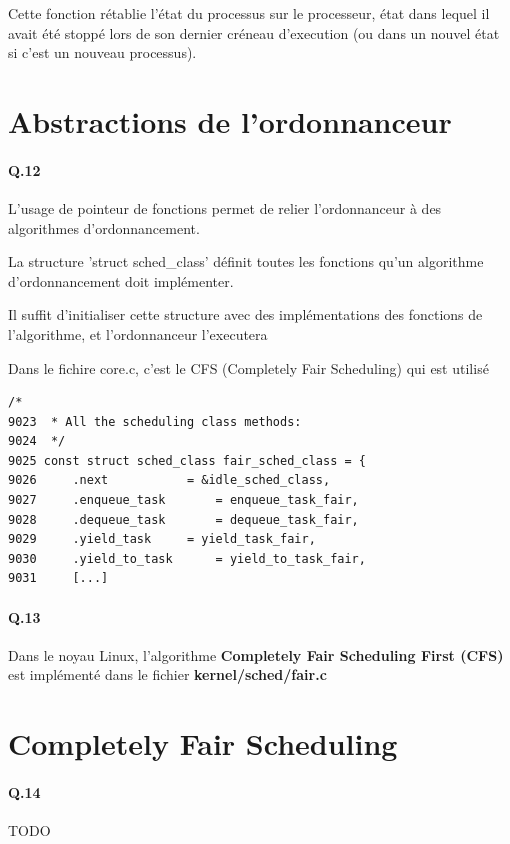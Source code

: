 \documentclass[10pt]{article}
\begin{document}
 Cette fonction rétablie l'état du processus sur le processeur, état dans lequel il avait été stoppé lors de son dernier créneau d'execution (ou dans un nouvel état si c'est un nouveau processus).

\newpage
\section{Abstractions de l'ordonnanceur}
 \paragraph{Q.12}
 L'usage de pointeur de fonctions permet de relier l'ordonnanceur à des algorithmes d'ordonnancement.
 
 La structure 'struct sched_class' définit toutes les fonctions qu'un algorithme d'ordonnancement doit implémenter.
 
 Il suffit d'initialiser cette structure avec des implémentations des fonctions de l'algorithme, et l'ordonnanceur l'executera

 Dans le fichire core.c, c'est le CFS (Completely Fair Scheduling) qui est utilisé

\lstset{language=C}
\begin{lstlisting}[frame=single]
      /*
9023  * All the scheduling class methods:
9024  */ 
9025 const struct sched_class fair_sched_class = {
9026     .next           = &idle_sched_class,
9027     .enqueue_task       = enqueue_task_fair,
9028     .dequeue_task       = dequeue_task_fair,
9029     .yield_task     = yield_task_fair,
9030     .yield_to_task      = yield_to_task_fair,
9031     [...] 
\end{lstlisting}

  \paragraph{Q.13}
  Dans le noyau Linux, l'algorithme \textbf{Completely Fair Scheduling First (CFS)} est implémenté dans le fichier \textbf{kernel/sched/fair.c}


\newpage
\section{Completely Fair Scheduling}
  \paragraph{Q.14} TODO


    \newpage
\end{document}
